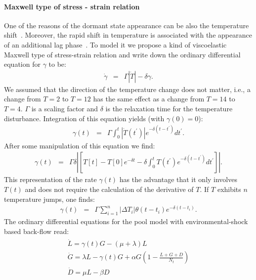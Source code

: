\documentclass[10pt,A4paper]{article}
\numberwithin{equation}{section}
\begin{document}
\paragraph{Maxwell type of stress - strain relation}
One of the reasons of the dormant state appearance can be also the temperature shift~\cite{oliver_viable_1995}.
Moreover, the rapid shift in temperature is associated with the appearance of an additional lag phase~\cite{zwietering_modeling_1994}.
To model it we propose a kind of viscoelastic Maxwell type of stress-strain relation and write down the ordinary differential equation for $\gamma$ to be:
\begin{eqnarray}
    \dot{\gamma} &=& \Gamma \left |\dot{T}\right |-\delta \gamma.
\label{eq:rate_backlag}
\end{eqnarray}
We assumed that the direction of the temperature change does not matter, i.e., a change from $T=2$ to $T=12$ has the same effect as a change from $T=14$ to $T=4$.
$\Gamma$ is a scaling factor and $\delta$ is the relaxation time for the temperature disturbance.
Integration of this equation yields (with $\gamma(0)=0$):
\begin{eqnarray}
    \gamma(t) &=& \Gamma \int_0^t \left |\dot{T}(t^{\prime})\right |e^{-\delta (t-t^{\prime})}dt^{\prime}.
\label{eq:rate_backlag2}
\end{eqnarray}
After some manipulation of this equation we find:
\begin{eqnarray}
    \gamma(t) &=& \Gamma\delta\left |\left[T[t]-T[0]e^{-\delta t}-\delta \int_0^t T(t^{\prime})e^{-\delta (t-t^{\prime})}dt^{\prime}\right]\right |.
\label{eq:rate_backlag3}
\end{eqnarray}
This representation of the rate $\gamma(t)$ has the advantage that it only involves $T(t)$ and does not require the calculation of the derivative of $T$.
If $T$ exhibits $n$ temperature jumps, one finds:
\begin{eqnarray}
    \gamma(t) &=& \Gamma\sum_{i=1}^n \left |\Delta T_i \right |\theta(t-t_i)e^{-\delta(t-t_i)}.
\label{eq:gamma_tempshift}
\end{eqnarray}
%
The ordinary differential equations for the pool model with environmental-shock based back-flow read:
\begin{align}
    \begin{split}
    \dot{L} =\gamma(t) G - (\mu + \lambda) L\\
    \dot{G} = \lambda L -\gamma(t) G + \alpha G\left(1-\frac{L+G+D}{N_t}\right)\\
    \dot{D} = \mu  L - \beta D
    \end{split}
\label{eq:ode_tempshift_backlag}
\end{align}
\end{document}
